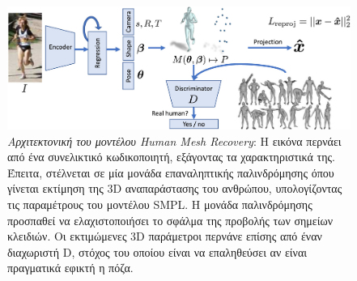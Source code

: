  \begin{figure}[h]
	\centering
	\includegraphics[scale=1.5]{images/chapter3/hmr_architecture.jpg}
	\caption[Αρχιτεκτονική του μοντέλου Human Mesh Recovery]{\textsl{Αρχιτεκτονική του μοντέλου Human Mesh Recovery}: H εικόνα περνάει από ένα συνελικτικό κωδικοποιητή, εξάγοντας τα χαρακτηριστικά της. Έπειτα, στέλνεται σε μία μονάδα επαναληπτικής παλινδρόμησης όπου γίνεται εκτίμηση της 3D αναπαράστασης του ανθρώπου, υπολογίζοντας τις παραμέτρους του μοντέλου SMPL. Η μονάδα παλινδρόμησης προσπαθεί να ελαχιστοποιήσει το σφάλμα της προβολής των σημείων κλειδιών. Οι εκτιμώμενες 3D παράμετροι περνάνε επίσης από έναν διαχωριστή D, στόχος του οποίου είναι να επαληθεύσει αν είναι πραγματικά εφικτή η πόζα.}
	\label{fig:hmr_architecture}
\end{figure}

